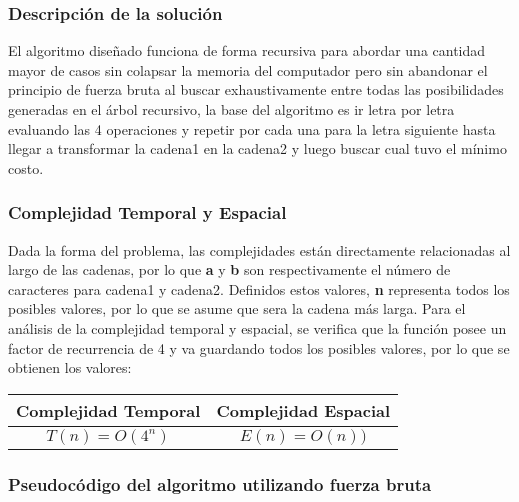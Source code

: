 
\subsubsection{Descripción de la solución}

El algoritmo diseñado funciona de forma recursiva para abordar una cantidad mayor de casos sin colapsar la memoria del computador pero sin abandonar el principio de fuerza bruta al buscar exhaustivamente entre todas las posibilidades generadas en el árbol recursivo, la base del algoritmo es ir letra por letra evaluando las 4 operaciones y repetir por cada una para la letra siguiente hasta llegar a transformar la cadena1 en la cadena2 y luego buscar cual tuvo el mínimo costo.

\subsubsection{Complejidad Temporal y Espacial}

Dada la forma del problema, las complejidades están directamente relacionadas al largo de las cadenas, por lo que \textbf{a} y \textbf{b} son respectivamente el número de caracteres para cadena1 y cadena2. Definidos estos valores, \textbf{n} representa todos los posibles valores, por lo que se asume que sera la cadena más larga. Para el análisis de la complejidad temporal y espacial, se verifica que la función posee un factor de recurrencia de 4 y va guardando todos los posibles valores, por lo que se obtienen los valores:
\begin{center}
\begin{tabular}{c|c}
\textbf{Complejidad Temporal} & \textbf{Complejidad Espacial} \\ \hline
$T(n) = O(4^{ n})$ & $E(n) = O(n))$
\end{tabular}
\end{center}

\subsubsection{Pseudocódigo del algoritmo utilizando fuerza bruta}

